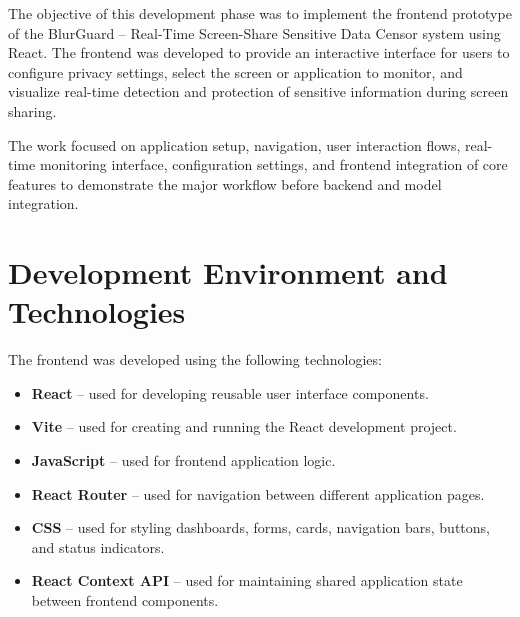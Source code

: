 \documentclass[12pt,a4paper]{article}
\begin{document}
The objective of this development phase was to implement the frontend prototype of the
BlurGuard -- Real-Time Screen-Share Sensitive Data Censor system using React. The frontend
was developed to provide an interactive interface for users to configure privacy settings,
select the screen or application to monitor, and visualize real-time detection and protection
of sensitive information during screen sharing.

The work focused on application setup, navigation, user interaction flows, real-time
monitoring interface, configuration settings, and frontend integration of core features
to demonstrate the major workflow before backend and model integration.


\section{Development Environment and Technologies}

The frontend was developed using the following technologies:

\begin{itemize}

    \item \textbf{React} -- used for developing reusable user interface components.

    \item \textbf{Vite} -- used for creating and running the React development project.

    \item \textbf{JavaScript} -- used for frontend application logic.

    \item \textbf{React Router} -- used for navigation between different application pages.

    \item \textbf{CSS} -- used for styling dashboards, forms, cards, navigation bars,
    buttons, and status indicators.

    \item \textbf{React Context API} -- used for maintaining shared application state
    between frontend components.

\end{itemize}

\end{document}
